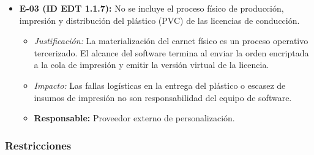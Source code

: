 \begin{itemize}
    \item \textbf{E-03 (ID EDT 1.1.7):} No se incluye el proceso físico de producción, impresión y distribución del plástico (PVC) de las licencias de conducción.
    \begin{itemize}
        \item \textit{Justificación:} La materialización del carnet físico es un proceso operativo tercerizado. El alcance del software termina al enviar la orden encriptada a la cola de impresión y emitir la versión virtual de la licencia.
        \item \textit{Impacto:} Las fallas logísticas en la entrega del plástico o escasez de insumos de impresión no son responsabilidad del equipo de software.
        \item \textbf{Responsable:} Proveedor externo de personalización.
    \end{itemize}
\end{itemize}

\subsubsection{Restricciones}


